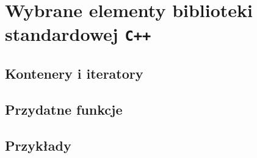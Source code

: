 \chapter{Wybrane elementy biblioteki standardowej \texttt{C++}}

\section{Kontenery i iteratory}

\section{Przydatne funkcje}

\section{Przykłady} 
